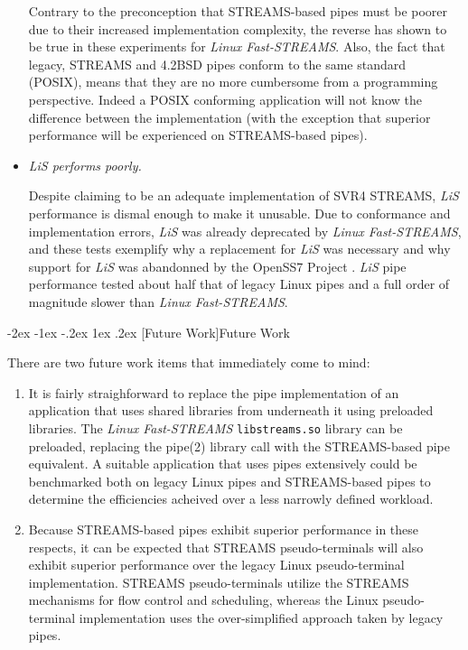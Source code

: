 \documentclass[letterpaper,final,notitlepage,twocolumn,10pt,twoside]{article}
\makeatletter
\renewcommand\section{\@startsection {section}{1}{\z@}%
                                   {-2ex \@plus -1ex \@minus -.2ex}%
                                   {1ex \@plus .2ex}%
                                   {\normalfont\large\bfseries}}
\makeatother
\begin{document}
\begin{itemize}
Contrary to the preconception that STREAMS-based pipes must be poorer due to
their increased implementation complexity, the reverse has shown to be true in
these experiments for \textsl{Linux Fast-STREAMS}.  Also, the fact that
legacy, STREAMS and 4.2BSD pipes conform to the same standard (POSIX), means
that they are no more cumbersome from a programming perspective.  Indeed a
POSIX conforming application will not know the difference between the
implementation (with the exception that superior performance will be
experienced on STREAMS-based pipes).

\item \textit{\textsl{LiS} performs poorly.}

Despite claiming to be an adequate implementation of SVR4 STREAMS,
\textsl{LiS} performance is dismal enough to make it unusable.  Due to
conformance and implementation errors, \textsl{LiS} was already deprecated by
\textsl{Linux Fast-STREAMS}, and these tests exemplify why a replacement for
\textsl{LiS} was necessary and why support for \textsl{LiS} was abandonned by
the OpenSS7 Project \cite[]{openss7}.  \textsl{LiS} pipe performance tested
about half that of legacy Linux pipes and a full order of magnitude slower
than \textsl{Linux Fast-STREAMS}.

\end{itemize}

\section[Future Work]{Future Work}

There are two future work items that immediately come to mind:

\begin{enumerate}

\item

It is fairly straighforward to replace the pipe implementation of an
application that uses shared libraries from underneath it using preloaded
libraries.  The \textsl{Linux Fast-STREAMS} \texttt{libstreams.so} library can
be preloaded, replacing the pipe(2) library call with the STREAMS-based pipe
equivalent.  A suitable application that uses pipes extensively could be
benchmarked both on legacy Linux pipes and STREAMS-based pipes to determine
the efficiencies acheived over a less narrowly defined workload.

\item

Because STREAMS-based pipes exhibit superior performance in these respects, it
can be expected that STREAMS pseudo-terminals will also exhibit superior
performance over the legacy Linux pseudo-terminal implementation.  STREAMS
pseudo-terminals utilize the STREAMS mechanisms for flow control and
scheduling, whereas the Linux pseudo-terminal implementation uses the
over-simplified approach taken by legacy pipes.

\end{enumerate}
\end{document}
